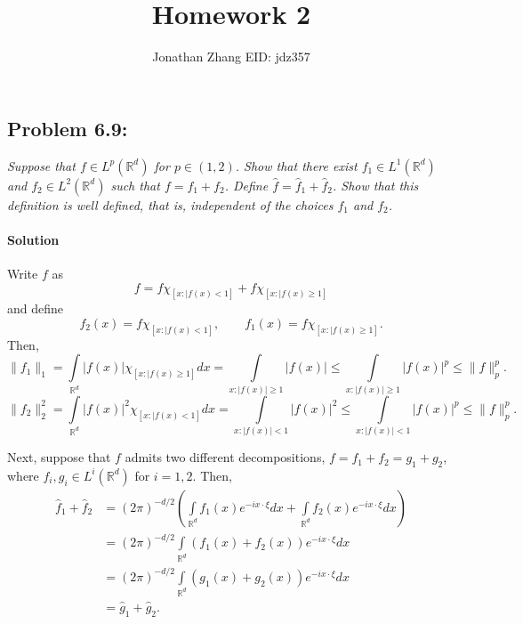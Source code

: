 \documentclass[letterpaper,twoside,11pt]{article}
\theoremstyle{mystyle}
\newcommand{\R}{{\mathbb R}}
\begin{document}
\title{\vspace{-2\baselineskip} 
Homework 2
}
\author{Jonathan Zhang \qquad EID: { jdz357} }
\date{}
\maketitle


\subsection*{Problem 6.9:}
\textit{
Suppose that $f\in L^p\left( \R^d \right)$ for $p \in \left( 1, 2 \right)$. Show that there exist $f_1 \in L^1\left( \R^d \right)$ and $f_2 \in L^2\left( \R^d \right)$ such that $f = f_1 + f_2$. 
Define $\hat f = \hat f_1 + \hat f_2$. Show that this definition is well defined, that is, independent of the choices $f_1$ and $f_2$. }

\paragraph*{Solution}
Write $f$ as 
\[f = f\chi_{[x:|f(x)<1]} + f\chi_{[x:|f(x)\geqslant 1]}\]
and define 
\[f_2(x) = f\chi_{[x:|f(x)<1]},\qquad f_1(x) = f\chi_{[x:|f(x)\geqslant 1]}.\]
Then, 
\[\|f_1\|_1 = \int\limits_{\R^d} |f(x)|\chi_{[x:|f(x)\geqslant 1]}dx = \int\limits_{x:|f(x)|\geqslant 1}|f(x)| \leq\int\limits_{x:|f(x)|\geqslant 1}|f(x)|^p \leq \|f\|_p^p. \]
\[\|f_2\|_2^2 = \int\limits_{\R^d} |f(x)|^2\chi_{[x:|f(x)< 1]}dx = \int\limits_{x:|f(x)|< 1}|f(x)|^2 \leq\int\limits_{x:|f(x)|< 1}|f(x)|^p \leq \|f\|_p^p. \]

Next, suppose that $f$ admits two different decompositions, $f = f_1 + f_2 = g_1 + g_2$, where $f_i, g_i \in L^i\left( \R^d \right)$ for $i = 1, 2$. Then, 
\begin{align*}
\hat f_1 + \hat f_2 &= \left( 2\pi \right)^{-d/2}\left(\int\limits_{\R^d} f_1(x) e^{-ix\cdot \xi } dx+\int\limits_{\R^d} f_2(x) e^{-ix\cdot \xi } dx \right)\\
&=\left( 2\pi \right)^{-d/2} \int\limits_{\R^d} \left( f_1(x) + f_2(x)  \right)e^{-ix\cdot \xi }dx\\
&=\left( 2\pi \right)^{-d/2} \int\limits_{\R^d} \left( g_1(x) + g_2(x)  \right)e^{-ix\cdot \xi }dx\\
&=\hat g_1 + \hat g_2.
\end{align*}
\end{document}
